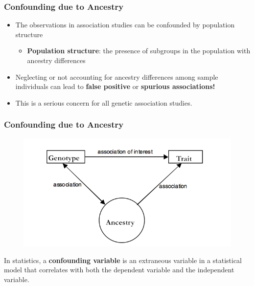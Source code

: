 \documentclass{beamer}
\begin{document}
\begin{frame}
\frametitle{\bf Confounding due to Ancestry}
\begin{itemize}
\item The observations in association studies can be confounded by population structure 
\begin{itemize}
\item {\bf Population structure}: the presence of subgroups in the population with ancestry differences
\end{itemize}
\item Neglecting or not accounting for ancestry differences among sample individuals can lead to {\bf false positive} or {\bf spurious associations!}
\item This is a serious concern for all genetic association studies.  
\end{itemize}
\end{frame}





\begin{frame}
\frametitle{\bf Confounding due to Ancestry }
\vspace{-.2cm}
\begin{figure}
\centering
\includegraphics[scale=.4]{Figures/Confounding.png}
\end{figure}
In statistics, a {\bf confounding variable}  is an extraneous variable in a statistical model that correlates with both the dependent variable and the independent variable. 

\end{frame}
\end{document}
